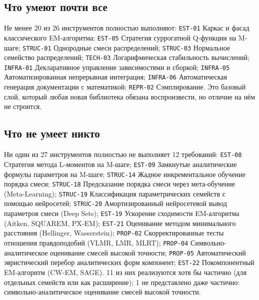 \documentclass[10pt,a4paper]{article}
\begin{document}
\subsection{Что умеют почти все}
Не менее 20 из 26 инструментов полностью выполняют: \texttt{EST-01} Каркас и фасад классического EM-алгоритма; \texttt{EST-05} Стратегия суррогатной Q-функции на M-шаге; \texttt{STRUC-01} Однородные смеси распределений; \texttt{STRUC-03} Нормальное семейство распределений; \texttt{TECH-03} Логарифмическая стабильность вычислений; \texttt{INFRA-01} Декларативное управление зависимостями и сборкой; \texttt{INFRA-05} Автоматизированная непрерывная интеграция; \texttt{INFRA-06} Автоматическая генерация документации с математикой; \texttt{REPR-02} Сэмплирование.
Это базовый слой, который любая новая библиотека обязана воспроизвести, но отличие на нём не строится.

\subsection{Что не умеет никто}
Ни один из 27 инструментов полностью не выполняет 12 требований: \texttt{EST-08} Стратегия метода L-моментов на M-шаге; \texttt{EST-09} Замкнутые аналитические формулы параметров на M-шаге; \texttt{STRUC-14} Жадное инкрементальное обучение порядка смеси; \texttt{STRUC-18} Предсказание порядка смеси через мета-обучение (Meta-Learning); \texttt{STRUC-19} Классификация параметрических семейств с помощью нейросетей; \texttt{STRUC-20} Амортизированный нейросетевой вывод параметров смеси (Deep Sets); \texttt{EST-19} Ускорение сходимости EM-алгоритма (Aitken, SQUAREM, PX-EM); \texttt{EST-21} Оценивание методом минимального расстояния (Hellinger, Wasserstein); \texttt{PROP-02} Скорректированные тесты отношения правдоподобий (VLMR, LMR, MLRT); \texttt{PROP-04} Символьно-аналитическое оценивание смесей высокой точности; \texttt{PROP-05} Автоматический эвристический перебор аналитических форм компонент; \texttt{EST-22} Покомпонентный EM-алгоритм (CW-EM, SAGE).
11 из них реализуются хотя бы частично (для отдельных семейств или как расширение);
1 не представлено даже частично: символьно-аналитическое оценивание смесей высокой точности.
\end{document}
